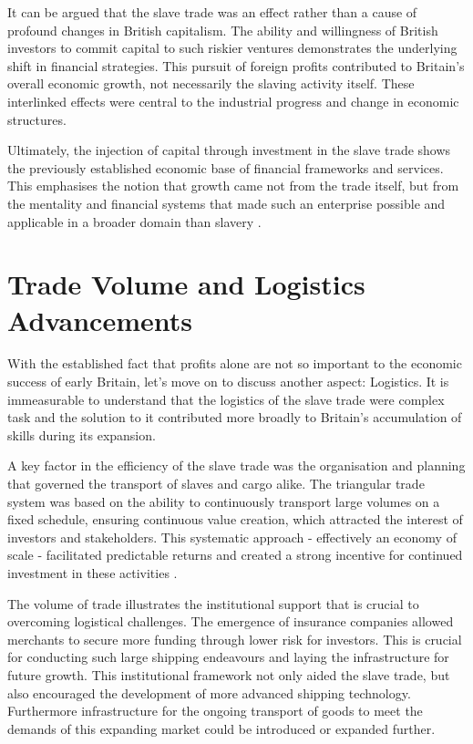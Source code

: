 \documentclass[a4paper,11pt]{article}
\begin{document}
It can be argued that the slave trade was an effect rather than a cause of profound changes in British capitalism. The ability and willingness of British investors to commit capital to such riskier ventures demonstrates the underlying shift in financial strategies. This pursuit of foreign profits contributed to Britain's overall economic growth, not necessarily the slaving activity itself. These interlinked effects were central to the industrial progress and change in economic structures.

Ultimately, the injection of capital through investment in the slave trade shows the previously established economic base of financial frameworks and services. This emphasises the notion that growth came not from the trade itself, but from the mentality and financial systems that made such an enterprise possible and applicable in a broader domain than slavery \citep{harley2015}.

\section{Trade Volume and Logistics Advancements}

With the established fact that profits alone are not so important to the economic success of early Britain, let's move on to discuss another aspect: Logistics. It is immeasurable to understand that the logistics of the slave trade were complex task and the solution to it contributed more broadly to Britain's accumulation of skills during its expansion.

A key factor in the efficiency of the slave trade was the organisation and planning that governed the transport of slaves and cargo alike. The triangular trade system was based on the ability to continuously transport large volumes on a fixed schedule, ensuring continuous value creation, which attracted the interest of investors and stakeholders. This systematic approach - effectively an economy of scale - facilitated predictable returns and created a strong incentive for continued investment in these activities \citep{harley2015}.

The volume of trade illustrates the institutional support that is crucial to overcoming logistical challenges. The emergence of insurance companies allowed merchants to secure more funding through lower risk for investors. This is crucial for conducting such large shipping endeavours and laying the infrastructure for future growth. This institutional framework not only aided the slave trade, but also encouraged the development of more advanced shipping technology. Furthermore infrastructure for the ongoing transport of goods to meet the demands of this expanding market could be introduced or expanded further.
\end{document}
